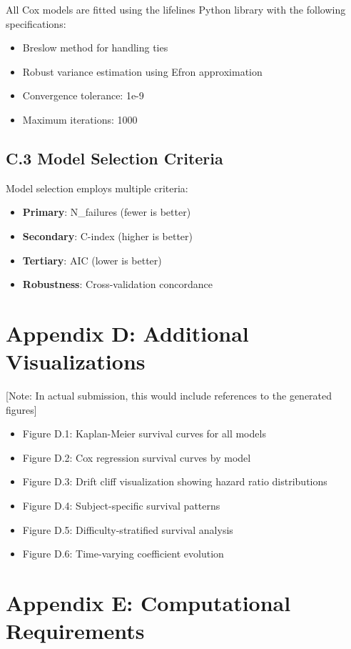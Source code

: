 \documentclass[letterpaper]{article}
\begin{document}
All Cox models are fitted using the lifelines Python library with the following specifications:
\begin{itemize}
\item Breslow method for handling ties
\item Robust variance estimation using Efron approximation
\item Convergence tolerance: 1e-9
\item Maximum iterations: 1000
\end{itemize}

\subsection*{C.3 Model Selection Criteria}

Model selection employs multiple criteria:
\begin{itemize}
\item \textbf{Primary}: N\_failures (fewer is better)
\item \textbf{Secondary}: C-index (higher is better)
\item \textbf{Tertiary}: AIC (lower is better)
\item \textbf{Robustness}: Cross-validation concordance
\end{itemize}

\section*{Appendix D: Additional Visualizations}

[Note: In actual submission, this would include references to the generated figures]

\begin{itemize}
\item Figure D.1: Kaplan-Meier survival curves for all models
\item Figure D.2: Cox regression survival curves by model
\item Figure D.3: Drift cliff visualization showing hazard ratio distributions
\item Figure D.4: Subject-specific survival patterns
\item Figure D.5: Difficulty-stratified survival analysis
\item Figure D.6: Time-varying coefficient evolution
\end{itemize}

\section*{Appendix E: Computational Requirements}
\end{document}
